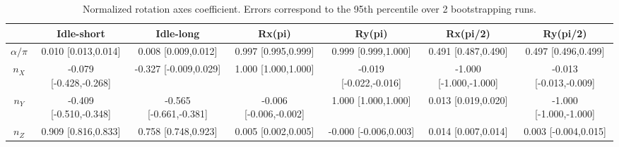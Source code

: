 \begin{table}[h!]
\centering
\caption{Normalized rotation axes coefficient. Errors                             correspond to the 95th percentile over 2 bootstrapping runs.}
\begin{tabular}{c|*{6}{c}}
\toprule
 & Idle-short & Idle-long & Rx(pi) & Ry(pi) & Rx(pi/2) & Ry(pi/2) \\
\midrule
$\alpha/\pi$ & 0.010 [0.013,0.014] & 0.008 [0.009,0.012] & 0.997 [0.995,0.999] & 0.999 [0.999,1.000] & 0.491 [0.487,0.490] & 0.497 [0.496,0.499] \\
$n_{X}$ & -0.079 [-0.428,-0.268] & -0.327 [-0.009,0.029] & 1.000 [1.000,1.000] & -0.019 [-0.022,-0.016] & -1.000 [-1.000,-1.000] & -0.013 [-0.013,-0.009] \\
$n_{Y}$ & -0.409 [-0.510,-0.348] & -0.565 [-0.661,-0.381] & -0.006 [-0.006,-0.002] & 1.000 [1.000,1.000] & 0.013 [0.019,0.020] & -1.000 [-1.000,-1.000] \\
$n_{Z}$ & 0.909 [0.816,0.833] & 0.758 [0.748,0.923] & 0.005 [0.002,0.005] & -0.000 [-0.006,0.003] & 0.014 [0.007,0.014] & 0.003 [-0.004,0.015] \\
\bottomrule
\end{tabular}
\end{table}
